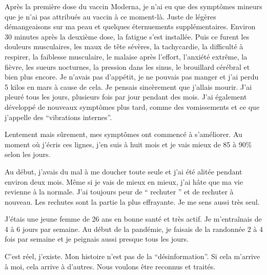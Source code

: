 Après la première dose du vaccin Moderna, je n'ai eu que des symptômes mineurs
que je n'ai pas attribués au vaccin à ce moment-là. Juste de légères
démangeaisons sur ma peau et quelques éternuements supplémentaires. Environ 30
minutes après la deuxième dose, la fatigue s'est installée. Puis ce furent les
douleurs musculaires, les maux de tête sévères, la tachycardie, la difficulté à
respirer, la faiblesse musculaire, le malaise après l'effort, l'anxiété extrême,
la fièvre, les sueurs nocturnes, la pression dans les sinus, le brouillard
cérébral et bien plus encore. Je n'avais pas d'appétit, je ne pouvais pas manger
et j'ai perdu 5 kilos en mars à cause de cela. Je pensais sincèrement que
j'allais mourir. J'ai pleuré tous les jours, plusieurs fois par jour pendant des
mois. J'ai également développé de nouveaux symptômes plus tard, comme des
vomissements et ce que j'appelle des “vibrations internes”.

Lentement mais sûrement, mes symptômes ont commencé à s'améliorer. Au moment où
j'écris ces lignes, j'en suis à huit mois et je vais mieux de 85 à 90\% selon
les jours.

Au début, j'avais du mal à me doucher toute seule et j'ai été alitée pendant
environ deux mois. Même si je vais de mieux en mieux, j'ai hâte que ma vie
revienne à la normale. J'ai toujours peur de “ rechuter ” et de rechuter à
nouveau. Les rechutes sont la partie la plus effrayante. Je me sens aussi très
seul.

J'étais une jeune femme de 26 ans en bonne santé et très actif. Je m'entraînais
de 4 à 6 jours par semaine. Au début de la pandémie, je faisais de la randonnée
2 à 4 fois par semaine et je peignais aussi presque tous les jours.

C'est réel, j'existe. Mon histoire n'est pas de la “désinformation”. Si cela
m'arrive à moi, cela arrive à d'autres. Nous voulons être reconnus et traités.

